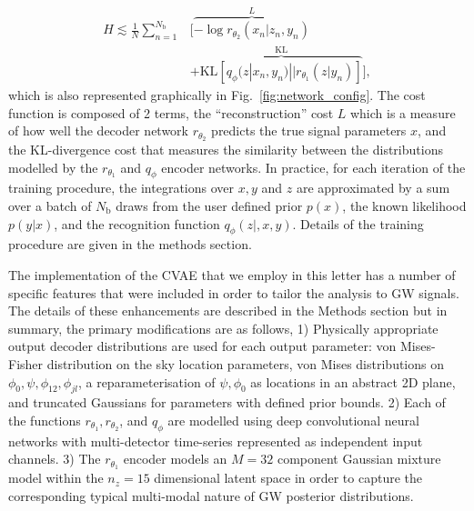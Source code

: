 \documentclass[%
showpacs,
nofootinbib,
 amsmath,amssymb,
 aps,
 twocolumn,
 prl,
 reprint,
floatfix,
]{revtex4-1}
\begin{document}
%
\begin{align}\label{eq:cost3} H \lesssim
\frac{1}{N}\sum_{n=1}^{N_{\text{b}}}&\Big[\overbrace{-\log
r_{\theta_{2}}(x_{n}|z_{n},y_{n})}^{L}\nonumber\\
&+\overbrace{\text{KL}\left[q_{\phi}(z|x_{n},y_{n})||r_{\theta_{1}}(z|y_{n})\right]}^{\text{KL}}\Big],
\end{align}
%
which is also represented graphically in Fig.~\ref{fig:network_config}.
The cost function is composed of 2 terms, the ``reconstruction'' cost $L$ which
is a measure of how well the decoder network $r_{\theta_2}$ predicts the true
signal parameters $x$, and the \ac{KL}-divergence cost that measures the
similarity between the distributions modelled by the $r_{\theta_1}$ and
$q_{\phi}$ encoder networks. In practice, for each iteration of the training
procedure, the integrations over $x,y$ and $z$ are approximated by a sum over a
batch of $N_{\text{b}}$ draws from the user defined prior $p(x)$, the known
likelihood $p(y|x)$, and the recognition function $q_{\phi}(z|,x,y)$. Details
of the training procedure are given in the methods section.  

%
%
The implementation of the \ac{CVAE} that we employ in this letter has a
number of specific features that were included in order to tailor the analysis to
\ac{GW} signals. The details of these enhancements are described in the Methods
section but in summary, the primary modifications are as follows, 1) Physically 
appropriate output decoder distributions are used for each output parameter: 
von Mises-Fisher distribution on the sky location parameters, von Mises 
distributions on $\phi_0,\psi,\phi_{12},\phi_{jl}$,  a reparameterisation of $\psi, \phi_0$ 
as locations in an abstract 2D plane,  and truncated Gaussians for
parameters with defined prior bounds. 2) Each of the
functions $r_{\theta_1},r_{\theta_2}$, and $q_{\phi}$ are modelled using deep
convolutional neural networks with multi-detector time-series represented as
independent input channels. 3) The $r_{\theta_1}$ encoder models an $M=32$ component
Gaussian mixture model within the $n_{z}=15$ dimensional latent space in order
to capture the corresponding typical multi-modal nature of \ac{GW} posterior
distributions.
\end{document}

